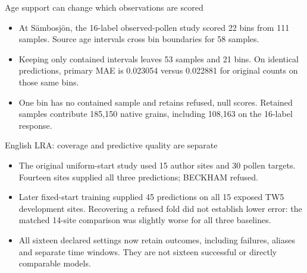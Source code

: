 \begin{frame}{Age support can change which observations are scored}
\begin{itemize}
\item At S\"ambosj\"on, the 16-label observed-pollen study scored 22 bins from 111 samples. Source age intervals cross bin boundaries for 58 samples.
\item Keeping only contained intervals leaves 53 samples and 21 bins. On identical predictions, primary MAE is 0.023054 versus 0.022881 for original counts on those same bins.
\item One bin has no contained sample and retains refused, null scores. Retained samples contribute 185,150 native grains, including 108,163 on the 16-label response.
\end{itemize}
\end{frame}

\begin{frame}{English LRA: coverage and predictive quality are separate}
\small
\begin{itemize}
\item The original uniform-start study used 15 author sites and 30 pollen targets. Fourteen sites supplied all three predictions; BECKHAM refused.
\item Later fixed-start training supplied 45 predictions on all 15 exposed TW5 development sites. Recovering a refused fold did not establish lower error: the matched 14-site comparison was slightly worse for all three baselines.
\item All sixteen declared settings now retain outcomes, including failures, aliases and separate time windows. They are not sixteen successful or directly comparable models.
\end{itemize}
\end{frame}

